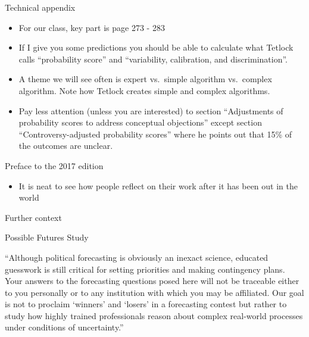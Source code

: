 \documentclass[aspectratio=169]{beamer}
\begin{document}
\begin{frame}

Technical appendix
\begin{itemize}
\item For our class, key part is page 273 - 283
\pause
\item If I give you some predictions you should be able to calculate what Tetlock calls ``probability score'' and ``variability, calibration, and discrimination''.
\pause
\item A theme we will see often is expert vs.\ simple algorithm vs.\ complex algorithm.  Note how Tetlock creates simple and complex algorithms.
\pause
\item Pay less attention (unless you are interested) to section ``Adjustments of probability scores to address conceptual objections'' except section ``Controversy-adjusted probability scores'' where he points out that 15\% of the outcomes are unclear.
\end{itemize}

\end{frame}
\begin{frame}

Preface to the 2017 edition
\begin{itemize}
\item It is neat to see how people reflect on their work after it has been out in the world
\end{itemize}

\end{frame}
\begin{frame}

Further context

\end{frame}
\begin{frame}

Possible Futures Study

\end{frame}
\begin{frame}

``Although political forecasting is obviously an inexact science, educated guesswork is still critical for setting priorities and making contingency plans. Your answers to the forecasting questions posed here will not be traceable either to you personally or to any institution with which you may be affiliated. Our goal is not to proclaim ‘winners’ and ‘losers’ in a forecasting contest but rather to study how highly trained professionals reason about complex real-world processes under conditions of uncertainty.''

\end{frame}
\end{document}
